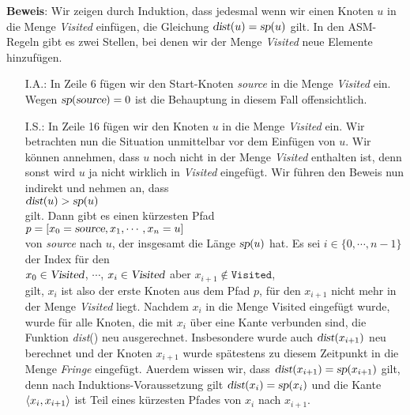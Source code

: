 \noindent
\textbf{Beweis}: Wir zeigen durch Induktion, dass jedesmal wenn wir einen Knoten $u$ in die Menge
\textsl{Visited} einf\"ugen, die Gleichung $\textsl{dist}(u) = \textsl{sp}(u)$ gilt.
In den ASM-Regeln gibt es zwei Stellen, bei denen wir der Menge \textsl{Visited} neue
Elemente hinzuf\"ugen.
\begin{enumerate}
\item[I.A.:]
      In Zeile 6 f\"ugen wir den Start-Knoten \textsl{source} in die Menge \textsl{Visited}
      ein.  Wegen $\textsl{sp}(\textsl{source}) = 0$ ist die Behauptung in diesem Fall
      offensichtlich.
\item[I.S.:]
      In Zeile 16 f\"ugen wir den Knoten $u$ in die Menge \textsl{Visited} ein.
      Wir betrachten nun die Situation unmittelbar vor dem Einf\"ugen von $u$.
      Wir k\"onnen annehmen, dass $u$ noch nicht in der Menge \textsl{Visited}
      enthalten ist, denn sonst wird $u$  ja nicht wirklich in \textsl{Visited} eingef\"ugt.
      Wir f\"uhren den Beweis nun indirekt und nehmen an, dass 
      \\[0.2cm]
      \hspace*{1.3cm} $\textsl{dist}(u) > \textsl{sp}(u)$
      \\[0.2cm]
      gilt.  Dann gibt es einen k\"urzesten Pfad 
      \\[0.2cm]
      \hspace*{1.3cm} $p = [ x_0 = \textsl{source}, x_1, \cdots, x_n = u ]$
      \\[0.2cm]
      von \textsl{source} nach $u$, der insgesamt die L\"ange $\textsl{sp}(u)$ hat.
      Es sei  $i\in\{0,\cdots,n-1\}$ der Index f\"ur den 
      \\[0.2cm]
      \hspace*{1.3cm}
      $x_0\in \textsl{Visited}$, $\cdots$, $x_i\in \textsl{Visited}$ \quad aber \quad $x_{i+1} \not\in \mathtt{Visited}$,
      \\[0.2cm]
      gilt, $x_i$ ist also der erste Knoten aus dem Pfad $p$, f\"ur den $x_{i+1}$ nicht mehr
      in der Menge
      \textsl{Visited} liegt.  Nachdem $x_i$ in die Menge Visited eingef\"ugt wurde,
      wurde f\"ur alle Knoten, die mit $x_i$ \"uber eine Kante verbunden sind,
      die Funktion \textsl{dist}() neu ausgerechnet.  Insbesondere
      wurde auch $\textsl{dist}(x_{i+1})$ neu berechnet und der Knoten $x_{i+1}$ wurde 
      sp\"atestens zu diesem Zeitpunkt in die Menge \textsl{Fringe} eingef\"ugt.
      Au\3erdem wissen wir, dass $\textsl{dist}(x_{i+1}) = \textsl{sp}(x_{i+1})$ gilt,
      denn nach Induktions-Voraussetzung gilt $\textsl{dist}(x_i) = \textsl{sp}(x_i)$
      und die Kante $\pair(x_i,x_{i+1})$ ist Teil eines k\"urzesten Pfades von $x_i$ nach $x_{i+1}$.
      

\end{enumerate}
